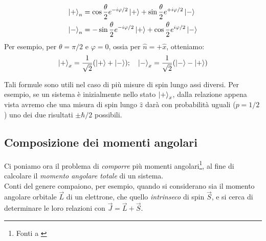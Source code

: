 \documentclass[../../FisicaTeorica.tex]{subfiles}
\begin{document}
\begin{align} \nonumber
    \Ket{+}_n &= \cos\frac{\theta}{2} e^{-i\varphi/2} \Ket{+} + \sin\frac{\theta}{2} e^{+i\varphi/2} \Ket{-}\\
    \Ket{-}_n &= -\sin\frac{\theta}{2} e^{-i\varphi/2}\Ket{+} + \cos\frac{\theta}{2} e^{i\varphi/2} \Ket{-}
    \label{eqn:spin-generici-formule}
\end{align}
Per esempio, per $\theta = \pi/2$ e $\varphi = 0$, ossia per $\hat{n}=+\hat{x}$, otteniamo:
\begin{align*}
\Ket{+}_x = \frac{1}{\sqrt{2}}(\Ket{+}+\Ket{-}); \quad \Ket{-}_x = \frac{1}{\sqrt{2}}(\Ket{-}-\Ket{+})
\end{align*}

Tali formule sono utili nel caso di più misure di spin lungo assi diversi. Per esempio, se un sistema è inizialmente nello stato $\Ket{+}_x$, dalla relazione appena vista avremo che una misura di spin lungo $\hat{z}$ darà con probabilità uguali ($p=1/2$) uno dei due risultati $\pm \hbar/2$ possibili.

\subsection{Composizione dei momenti angolari}
Ci poniamo ora il problema di \textit{comporre} più momenti angolari\footnote{Fonti a \cite{fonti_momenti}}, al fine di calcolare il \textit{momento angolare totale} di un sistema.\\
Conti del genere compaiono, per esempio, quando si considerano sia il momento angolare orbitale $\vec{L}$ di un elettrone, che quello \textit{intrinseco} di spin $\vec{S}$, e si cerca di determinare le loro relazioni con $\vec{J}=\vec{L}+\vec{S}$.\\
\end{document}
